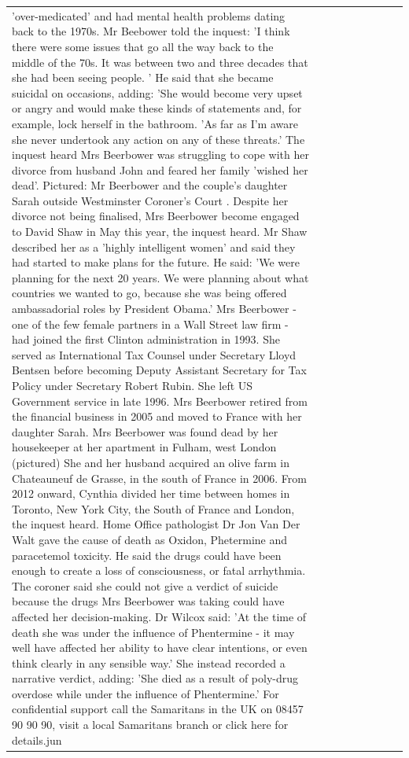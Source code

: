 \begin{table}[H]
\begin{tabular}{lllrlllll}
'over-medicated' and had mental health problems dating back to the 1970s. Mr Beebower told the inquest: 'I think there were some issues that go all the way back to the middle of the 70s. It was between two and three decades that she had been seeing people. ' He said that she became suicidal on occasions, adding: 'She would become very upset or angry and would make these kinds of statements and, for example, lock herself in the bathroom. 'As far as I'm aware she never undertook any action on any of these threats.' The inquest heard Mrs Beerbower was struggling to cope with her divorce from husband John and feared her family 'wished her dead'. Pictured: Mr Beerbower and the couple's daughter Sarah outside Westminster Coroner's Court . Despite her divorce not being finalised, Mrs Beerbower become engaged to David Shaw in May this year, the inquest heard. Mr Shaw described her as a 'highly intelligent women' and said they had started to make plans for the future. He said: 'We were planning for the next 20 years. We were planning about what countries we wanted to go, because she was being offered ambassadorial roles by President Obama.' Mrs Beerbower - one of the few female partners in a Wall Street law firm - had joined the first Clinton administration in 1993. She served as International Tax Counsel under Secretary Lloyd Bentsen before becoming Deputy Assistant Secretary for Tax Policy under Secretary Robert Rubin. She left US Government service in late 1996. Mrs Beerbower retired from the financial business in 2005 and moved to France with her daughter Sarah. Mrs Beerbower was found dead by her housekeeper at her apartment in Fulham, west London (pictured) She and her husband acquired an olive farm in Chateauneuf de Grasse, in the south of France in 2006. From 2012 onward, Cynthia divided her time between homes in Toronto, New York City, the South of France and London, the inquest heard. Home Office pathologist Dr Jon Van Der Walt gave the cause of death as Oxidon, Phetermine and paracetemol toxicity. He said the drugs could have been enough to create a loss of consciousness, or fatal arrhythmia. The coroner said she could not give a verdict of suicide because the drugs Mrs Beerbower was taking could have affected her decision-making. Dr Wilcox said: 'At the time of death she was under the influence of Phentermine - it may well have affected her ability to have clear intentions, or even think clearly in any sensible way.' She instead recorded a narrative verdict, adding: 'She died as a result of poly-drug overdose while under the influence of Phentermine.' For confidential support call the Samaritans in the UK on 08457 90 90 90, visit a local Samaritans branch or click here for details.jun \\

\end{tabular}
\end{table}

